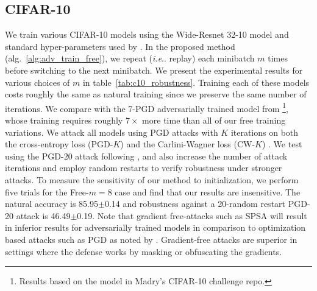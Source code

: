 \documentclass{article}
\makeatletter
\DeclareRobustCommand\onedot{\futurelet\@let@token\@onedot}
\def\@onedot{\ifx\@let@token.\else.\null\fi\xspace}
\def\ie{\emph{i.e}\onedot} \def\Ie{\emph{I.e}\onedot}
\makeatother
\begin{document}
\subsection*{CIFAR-10}
We train various CIFAR-10 models using the Wide-Resnet 32-10 model and standard hyper-parameters used by \cite{madry2017towards}. 
In the proposed method (alg.~\ref{alg:adv_train_free}), we repeat (\ie replay) each minibatch $m$ times before switching to the next minibatch. We present the experimental results for various choices of $m$ in table~\ref{tab:c10_robustness}. Training each of these models costs roughly the same as natural training since we preserve the same number of iterations.
We compare with the 7-PGD adversarially trained model from \cite{madry2017towards} \footnote{Results based on the  model in Madry's CIFAR-10 challenge repo.}, whose training requires roughly $7\times$ more time than all of our free training variations.
We attack all models using PGD attacks with $K$ iterations on both the cross-entropy loss (PGD-$K$) and the Carlini-Wagner loss (CW-$K$) \citep{carlini2017towards}. 
We test using the PGD-$20$ attack following \cite{madry2017towards}, and also increase the number of attack iterations and employ random restarts to verify robustness under stronger attacks. 
To measure the sensitivity of our method to initialization, we perform five trials for the Free-$m=8$ case and find that our results are insensitive. The natural accuracy is  85.95$\pm$0.14 and robustness against a 20-random restart PGD-20 attack is 46.49$\pm$0.19. 
Note that gradient free-attacks such as SPSA 
will result in inferior results for adversarially trained models in comparison to optimization based attacks such as PGD as noted by \cite{uesato2018adversarial}. Gradient-free attacks are superior in settings where the defense works by masking or obfuscating the gradients.
\end{document}
